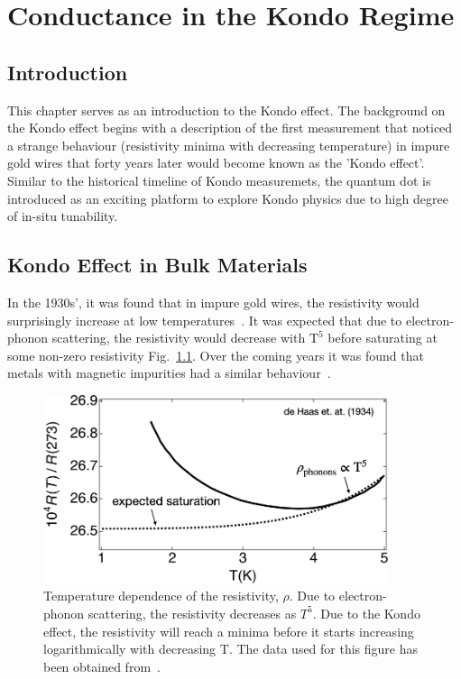 \chapter{Conductance in the Kondo Regime}\label{cha:kondo_conductance}

\section{Introduction}
This chapter serves as an introduction to the Kondo effect. The background on the Kondo effect begins with a description of the first measurement that noticed a strange behaviour (resistivity minima with decreasing temperature) in impure gold wires that forty years later would become known as the 'Kondo effect'. Similar to the historical timeline of Kondo measuremets, the quantum dot is introduced as an exciting platform to explore Kondo physics due to high degree of in-situ tunability. 


\afterpage{\clearpage}
\section{Kondo Effect in Bulk Materials}


In the 1930s', it was found that in impure gold wires, the resistivity would surprisingly increase at low temperatures~\cite{de_haas}. It was expected that due to electron-phonon scattering, the resistivity would decrease with $\mathrm{T^5}$ before saturating at some non-zero resistivity Fig.~\ref{fig:ch2/kondo_bulkmetal}. Over the coming years it was found that metals with  magnetic impurities had a similar behaviour~\cite{still_irresistible}.


\begin{figure}[!hbt]
  \begin{center}
    \includegraphics[width=0.9\textwidth]{figures/ch2/crop_FiguresMaster.008.png}
    \caption[Kondo effect in bulk materials]{\label{fig:ch2/kondo_bulkmetal} 
    Temperature dependence of the resistivity, $\rho$. Due to electron-phonon scattering, the resistivity decreases as $T^5$. Due to the Kondo effect, the resistivity will reach a minima before it starts increasing logarithmically with decreasing $\mathrm{T}$. The data used for this figure has been obtained from~\cite{de_haas}.
      }
  \end{center}
\end{figure}

